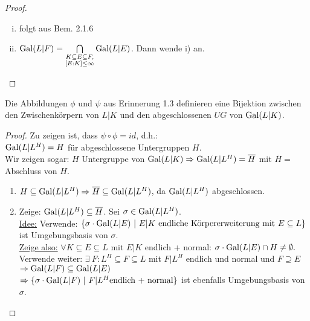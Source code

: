\begin{proof}
\begin{enumerate}[i)]
\item folgt aus Bem. 2.1.6
\item $\operatorname{Gal}(L|F) = \bigcap \limits_{\substack{K \subseteq E \subseteq F,\\ [E:K] \leq \infty}} \operatorname{Gal}(L|E)$. Dann wende i) an.
\end{enumerate}
\end{proof}

\begin{Satz}
Die Abbildungen $\phi$ und $\psi$ aus Erinnerung 1.3 definieren eine Bijektion zwischen den Zwischenkörpern von $L|K$ und den abgeschlossenen $UG$ von $\operatorname{Gal}(L|K)$.
\end{Satz}

\begin{proof}
Zu zeigen ist, dass $\psi \circ \phi = id$, d.h.:\\
$\operatorname{Gal}(L|L^H)=H$ für abgeschlossene Untergruppen $H$.\\
Wir zeigen sogar: $H$ Untergruppe von $\operatorname{Gal}(L|K) \Rightarrow \operatorname{Gal}(L|L^H)=\overline{H}$ mit $\overline{H}=$ Abschluss von $H$.
\begin{enumerate}[(1)]
\item $H \subseteq \operatorname{Gal}(L|L^H) \Rightarrow \overline{H} \subseteq \operatorname{Gal}(L|L^H)$, da $\operatorname{Gal}(L|L^H)$ abgeschlossen.
\item Zeige: $\operatorname{Gal}(L|L^H) \subseteq \overline{H}$. Sei $\sigma \in \operatorname{Gal}(L|L^H)$.\\
\underline{Idee:} Verwende: $\{\sigma \cdot \operatorname{Gal}(L|E) \ | \ E|K \text{ endliche Körpererweiterung mit } E \subseteq L \}$ ist Umgebungsbasis von $\sigma$.\\
\underline{Zeige also:} $\forall K \subseteq E \subseteq L$ mit $E|K$ endlich + normal: $\sigma \cdot \operatorname{Gal}(L|E) \cap H \neq \emptyset.$
Verwende weiter: $\exists \ F: L^H \subseteq F \subseteq L$ mit $F|L^H$ endlich und normal und $F \supseteq E$\\
$\Rightarrow \operatorname{Gal}(L|F) \subseteq \operatorname{Gal}(L|E)$\\
$\Rightarrow \{\sigma \cdot \Gal(L|F) \ | \ F|L^H \text{endlich + normal}\}$ ist ebenfalls Umgebungsbasis von $\sigma$.\\

\end{enumerate}
\end{proof}
